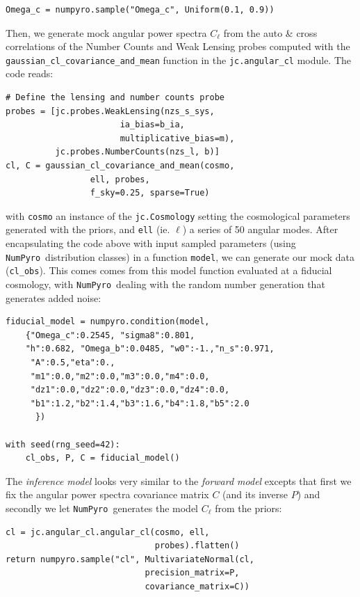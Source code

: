 \documentclass[twocolumn,twocolappendix,nofootinbib,iop]{openjournal}
\newcommand{\numpyro}{\texttt{NumPyro}}
\begin{document}
\begin{lstlisting}[language=iPython]
Omega_c = numpyro.sample("Omega_c", Uniform(0.1, 0.9))
\end{lstlisting}

Then, we generate mock angular power spectra $C_\ell$ from the auto \& cross correlations of the Number Counts and Weak Lensing probes computed with the \texttt{gaussian\_cl\_covariance\_and\_mean} function in the \texttt{jc.angular\_cl} module. The code reads:
\begin{lstlisting}[language=iPython]
# Define the lensing and number counts probe
probes = [jc.probes.WeakLensing(nzs_s_sys, 
                       ia_bias=b_ia,
                       multiplicative_bias=m),
          jc.probes.NumberCounts(nzs_l, b)]
cl, C = gaussian_cl_covariance_and_mean(cosmo, 
                 ell, probes, 
                 f_sky=0.25, sparse=True)
\end{lstlisting}

with \texttt{cosmo} an instance of the \texttt{jc.Cosmology} setting the cosmological parameters generated with the priors, and \texttt{ell} (ie. $\ell$) a series of 50 angular modes. After encapsulating the code above with input sampled parameters (using \numpyro\ distribution classes) in a function \texttt{model}, we can generate our mock data (\texttt{cl\_obs}). This comes comes from this model function evaluated at a fiducial cosmology, with \numpyro\ dealing with the random number generation that generates added noise:

\begin{lstlisting}[language=iPython]
fiducial_model = numpyro.condition(model,
    {"Omega_c":0.2545, "sigma8":0.801, 
    "h":0.682, "Omega_b":0.0485, "w0":-1.,"n_s":0.971,
     "A":0.5,"eta":0.,
     "m1":0.0,"m2":0.0,"m3":0.0,"m4":0.0,
     "dz1":0.0,"dz2":0.0,"dz3":0.0,"dz4":0.0,
     "b1":1.2,"b2":1.4,"b3":1.6,"b4":1.8,"b5":2.0
      })

with seed(rng_seed=42):
    cl_obs, P, C = fiducial_model()
\end{lstlisting}

The \textit{inference model} looks very similar to the \textit{forward model} excepts that first we fix the angular power spectra covariance matrix $C$ (and its inverse $P$) and secondly we let \numpyro\ generates the model $C_{\ell}$ from the priors:
\begin{lstlisting}[language=iPython]
cl = jc.angular_cl.angular_cl(cosmo, ell, 
                              probes).flatten()
return numpyro.sample("cl", MultivariateNormal(cl, 
                            precision_matrix=P,
                            covariance_matrix=C))
\end{lstlisting}
\end{document}
